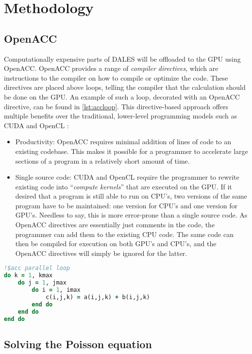\section{Methodology}

\subsection{OpenACC}
Computationally expensive parts of DALES will be offloaded to the GPU using OpenACC. OpenACC provides a range of \emph{compiler directives}, which are instructions to the compiler on how to compile or optimize the code. These directives are placed above loops, telling the compiler that the calculation should be done on the GPU. An example of such a loop, decorated with an OpenACC directive, can be found in \autoref{lst:accloop}. This directive-based approach offers multiple benefits over the traditional, lower-level programming models such as CUDA and OpenCL \citep{}:

\begin{itemize}
    \item Productivity: OpenACC requires minimal addition of lines of code to an existing codebase. This makes it possible for a programmer to accelerate large sections of a program in a relatively short amount of time. 
    \item Single source code: CUDA and OpenCL require the programmer to rewrite existing code into ``\emph{compute kernels}'' that are executed on the GPU. If it desired that a program is still able to run on CPU's, two versions of the same program have to be maintained: one version for CPU's and one version for GPU's. Needless to say, this is more error-prone than a single source code. As OpenACC directives are essentially just comments in the code, the programmer can add them to the existing CPU code. The same code can then be compiled for execution on both GPU's and CPU's, and the OpenACC directives will simply be ignored for the latter.
\end{itemize}

\begin{lstlisting}[language=Fortran, caption={Example of a Fortran loop offloaded to the GPU.}, label={lst:accloop}]
!$acc parallel loop
do k = 1, kmax
    do j = 1, jmax
        do i = 1, imax
            c(i,j,k) = a(i,j,k) + b(i,j,k)
        end do
    end do
end do
\end{lstlisting}

\subsection{Solving the Poisson equation}

